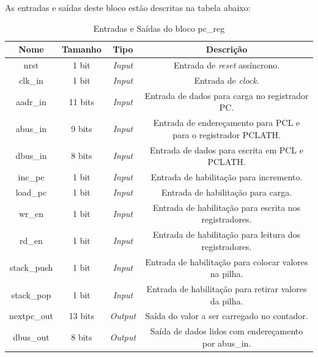 \documentclass{article}
\begin{document}
As entradas e saídas deste bloco estão descritas na tabela abaixo:\\

\begin{table}[ht]
    \begin{center}
        \begin{tabular}{|c|c|c|c|}
            \hline
            Nome & Tamanho & Tipo & Descrição\\
            \hline
            nrst & 1 bit & \textit{Input} & Entrada de \textit{reset} assíncrono.\\
            \hline
            clk\_in & 1 bit & \textit{Input} & Entrada de \textit{clock}.\\
            \hline
            aadr\_in & 11 bits & \textit{Input} & Entrada de dados para carga no registrador PC.\\
            \hline
            abus\_in & 9 bits & \textit{Input} & Entrada de endereçamento para PCL e para o registrador PCLATH.\\
            \hline
            dbus\_in & 8 bits & \textit{Input} & Entrada de dados para escrita em PCL e PCLATH.\\
            \hline
            inc\_pc & 1 bit & \textit{Input} & Entrada de habilitação para incremento.\\
            \hline
            load\_pc & 1 bit & \textit{Input} & Entrada de habilitação para carga.\\
            \hline
            wr\_en & 1 bit & \textit{Input} & Entrada de habilitação para escrita nos registradores.\\
            \hline
            rd\_en & 1 bit & \textit{Input} & Entrada de habilitação para leitura dos registradores.\\
            \hline
            stack\_push & 1 bit & \textit{Input} & Entrada de habilitação para colocar valores na pilha.\\
            \hline
            stack\_pop & 1 bit & \textit{Input} & Entrada de habilitação para retirar valores da pilha.\\
            \hline
            nextpc\_out & 13 bits & \textit{Output} & Saída do valor a ser carregado no contador.\\
            \hline
            dbus\_out & 8 bits & \textit{Output} & Saída de dados lidos com endereçamento por abus\_in.\\
            \hline
        \end{tabular}
    \end{center}
    \caption{Entradas e Saídas do bloco pc\_reg}
\end{table}
\end{document}
